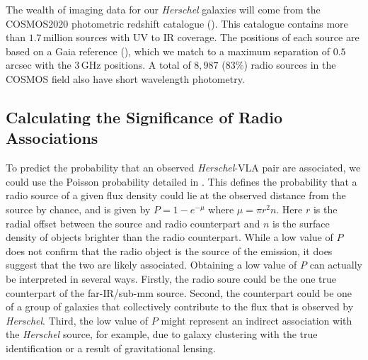 The wealth of imaging data for our \textit{Herschel} galaxies will come from the COSMOS2020 photometric redshift catalogue (\citealt{Weaver_2022}). This catalogue contains more than $1.7\,$million sources with UV to IR coverage. The positions of each source are based on a Gaia reference (\citealt{Gaia_2016}), which we match to a maximum separation of $0.5\,$arcsec with the $3\,$GHz positions. A total of $8,987$ ($83\%$) radio sources in the COSMOS field also have short wavelength photometry.

\subsection{Calculating the Significance of Radio Associations}
\label{sec:radio_significance}

To predict the probability that an observed \textit{Herschel}-VLA pair are associated, we could use the Poisson probability detailed in \citealt{Downes_1986}. This defines the probability that a radio source of a given flux density could lie at the observed distance from the source by chance, and is given by $P = 1-e^{-\mu}$ where $\mu = \pi r^2n$. Here $r$ is the radial offset between the source and radio counterpart and $n$ is the surface density of objects brighter than the radio counterpart. While a low value of $P$ does not confirm that the radio object is the source of the emission, it does suggest that the two are likely associated. Obtaining a low value of $P$ can actually be interpreted in several ways. Firstly, the radio soure could be the one true counterpart of the far-IR/sub-mm source. Second, the counterpart could be one of a group of galaxies that collectively contribute to the flux that is observed by \textit{Herschel}. Third, the low value of $P$ might represent an indirect association with the \textit{Herschel} source, for example, due to galaxy clustering with the true identification or a result of gravitational lensing.

